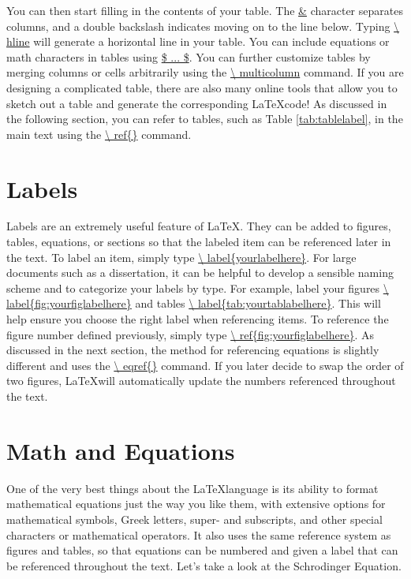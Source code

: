 You can then start filling in the contents of your table. The \url{&} character separates columns, and a double backslash indicates moving on to the line below. Typing \url{\ hline} will generate a horizontal line in your table. You can include equations or math characters in tables using \url{$ ... $}. You can further customize tables by merging columns or cells arbitrarily using the \url{\ multicolumn} command. If you are designing a complicated table, there are also many online tools that allow you to sketch out a table and generate the corresponding \LaTeX code! As discussed in the following section, you can refer to tables, such as Table \ref{tab:tablelabel}, in the main text using the \url{\ ref{}} command.

\section{Labels}

Labels are an extremely useful feature of \LaTeX. They can be added to figures, tables, equations, or sections so that the labeled item can be referenced later in the text. To label an item, simply type \url{\ label{yourlabelhere}}. For large documents such as a dissertation, it can be helpful to develop a sensible naming scheme and to categorize your labels by type. For example, label your figures \url{\ label{fig:yourfiglabelhere}} and tables \url{\ label{tab:yourtablabelhere}}. This will help ensure you choose the right label when referencing items. To reference the figure number defined previously, simply type \url{\ ref{fig:yourfiglabelhere}}. As discussed in the next section, the method for referencing equations is slightly different and uses the \url{\ eqref{}} command. If you later decide to swap the order of two figures, \LaTeX will automatically update the numbers referenced throughout the text.

\section{Math and Equations}

One of the very best things about the \LaTeX language is its ability to format mathematical equations just the way you like them, with extensive options for mathematical symbols, Greek letters, super- and subscripts, and other special characters or mathematical operators. It also uses the same reference system as figures and tables, so that equations can be numbered and given a label that can be referenced throughout the text. Let's take a look at the Schrodinger Equation.

